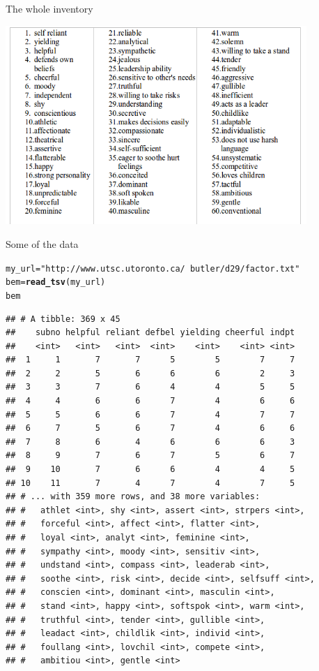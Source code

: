 \documentclass[unknownkeysallowed]{beamer}\usepackage[]{graphicx}\usepackage[]{color}
\makeatletter
\newcommand{\hlstr}[1]{\textcolor[rgb]{0.192,0.494,0.8}{#1}}%
\newcommand{\hlstd}[1]{\textcolor[rgb]{0.345,0.345,0.345}{#1}}%
\newcommand{\hlkwb}[1]{\textcolor[rgb]{0.69,0.353,0.396}{#1}}%
\newcommand{\hlkwd}[1]{\textcolor[rgb]{0.737,0.353,0.396}{\textbf{#1}}}%
\newenvironment{kframe}{%
 \def\at@end@of@kframe{}%
 \ifinner\ifhmode%
  \def\at@end@of@kframe{\end{minipage}}%
  \begin{minipage}{\columnwidth}%
 \fi\fi%
 \def\FrameCommand##1{\hskip\@totalleftmargin \hskip-\fboxsep
 \colorbox{shadecolor}{##1}\hskip-\fboxsep
     \hskip-\linewidth \hskip-\@totalleftmargin \hskip\columnwidth}%
 \MakeFramed {\advance\hsize-\width
   \@totalleftmargin\z@ \linewidth\hsize
   \@setminipage}}%
 {\par\unskip\endMakeFramed%
 \at@end@of@kframe}
\newenvironment{knitrout}{}{} %
\makeatother
\begin{document}
\begin{frame}[fragile]{The whole inventory}

\includegraphics[width=4.5in]{bem}

\end{frame}

\begin{frame}[fragile]{Some of the data}

\begin{knitrout}\scriptsize
{}\color{fgcolor}\begin{kframe}
\begin{alltt}
\hlstd{my_url}\hlkwb{=}\hlstr{"http://www.utsc.utoronto.ca/~butler/d29/factor.txt"}
\hlstd{bem}\hlkwb{=}\hlkwd{read_tsv}\hlstd{(my_url)}
\hlstd{bem}
\end{alltt}
\begin{verbatim}
## # A tibble: 369 x 45
##    subno helpful reliant defbel yielding cheerful indpt
##    <int>   <int>   <int>  <int>    <int>    <int> <int>
##  1     1       7       7      5        5        7     7
##  2     2       5       6      6        6        2     3
##  3     3       7       6      4        4        5     5
##  4     4       6       6      7        4        6     6
##  5     5       6       6      7        4        7     7
##  6     7       5       6      7        4        6     6
##  7     8       6       4      6        6        6     3
##  8     9       7       6      7        5        6     7
##  9    10       7       6      6        4        4     5
## 10    11       7       4      7        4        7     5
## # ... with 359 more rows, and 38 more variables:
## #   athlet <int>, shy <int>, assert <int>, strpers <int>,
## #   forceful <int>, affect <int>, flatter <int>,
## #   loyal <int>, analyt <int>, feminine <int>,
## #   sympathy <int>, moody <int>, sensitiv <int>,
## #   undstand <int>, compass <int>, leaderab <int>,
## #   soothe <int>, risk <int>, decide <int>, selfsuff <int>,
## #   conscien <int>, dominant <int>, masculin <int>,
## #   stand <int>, happy <int>, softspok <int>, warm <int>,
## #   truthful <int>, tender <int>, gullible <int>,
## #   leadact <int>, childlik <int>, individ <int>,
## #   foullang <int>, lovchil <int>, compete <int>,
## #   ambitiou <int>, gentle <int>
\end{verbatim}
\end{kframe}
\end{knitrout}


\end{frame}
\end{document}
